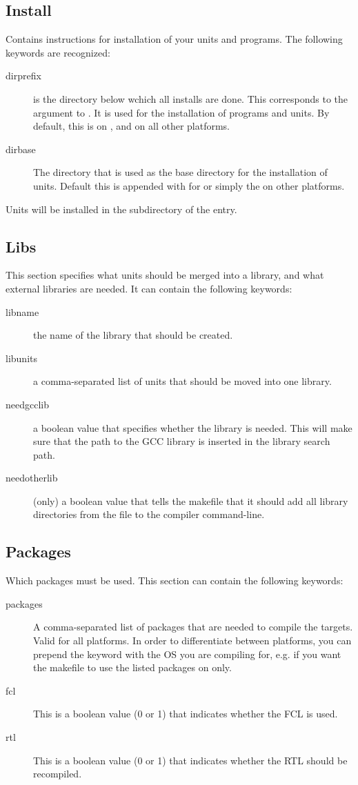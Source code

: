 \subsection{Install}
Contains instructions for installation of your units and programs. The
following keywords are recognized:
\begin{description}
\item[dirprefix] is the directory below wchich all installs are done.
This corresponds to the  argument to \gnu {}.
It is used for the installation of programs and units. By default, this is
 on \linux, and  on all other platforms.
\item[dirbase]
The directory that is used as the base directory for the installation of
units. Default this is  appended with 
for \linux or simply the  on other platforms.
\end{description}
Units will be installed in the subdirectory  
of the  entry.

\subsection{Libs}
This section specifies what units should be merged into a library, and what
external libraries are needed. It can contain the following keywords:
\begin{description}
\item[libname] the name of the library that should be created.
\item[libunits] a comma-separated list of units that should be moved into
one library.
\item[needgcclib] a boolean value that specifies whether the 
library is needed. This will make sure that the path to the GCC library
is inserted in the library search path.
\item[needotherlib]
(\linux only) a boolean value that tells the makefile that it should add
all library directories from the  file to the compiler
command-line.
\end{description}

\subsection{Packages}
Which packages must be used. This section can contain the following keywords:
\begin{description}
\item[packages]
A comma-separated list of packages that are needed to compile the targets.
Valid for all platforms. In order to differentiate between platforms, you
can prepend the keyword  with the OS you are compiling for,
e.g.   if you want the makefile to use the listed
packages on \linux only.
\item[fcl] This is a boolean value (0 or 1) that indicates whether the FCL is used.
\item[rtl]
This is a boolean value (0 or 1) that indicates whether the RTL should be
recompiled.
\end{description}

